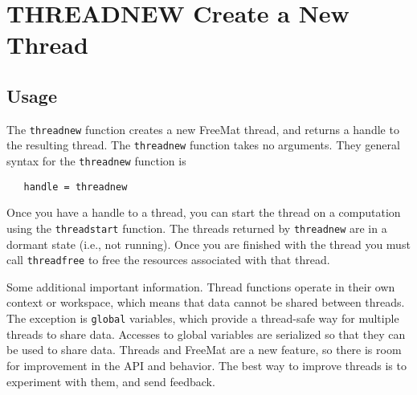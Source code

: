 \section{THREADNEW Create a New Thread}

\subsection{Usage}

The \verb|threadnew| function creates a new FreeMat thread, and
returns a handle to the resulting thread.   The \verb|threadnew|
function takes no arguments.  They general syntax for the
\verb|threadnew| function is
\begin{verbatim}
   handle = threadnew
\end{verbatim}
Once you have a handle to a thread, you can start the thread
on a computation using the \verb|threadstart| function.  The
threads returned by \verb|threadnew| are in a dormant state (i.e.,
not running).  Once you are finished with the thread you
must call \verb|threadfree| to free the resources associated with
that thread.

Some additional important information.  Thread functions operate
in their own context or workspace, which means that data cannot
be shared between threads.  The exception is \verb|global| variables,
which provide a thread-safe way for multiple threads to share data.
Accesses to global variables are serialized so that they can 
be used to share data.  Threads and FreeMat are a new feature, so
there is room for improvement in the API and behavior.  The best
way to improve threads is to experiment with them, and send feedback.
